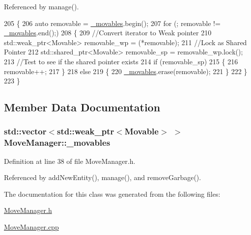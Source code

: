 Referenced by manage().


\begin{DoxyCode}
205 \{
206     \textcolor{keyword}{auto} removable = \hyperlink{classMoveManager_a7fc3d147dbcc1df9e2099e193bca489d}{\_movables}.begin();
207     \textcolor{keywordflow}{for} (; removable != \hyperlink{classMoveManager_a7fc3d147dbcc1df9e2099e193bca489d}{\_movables}.end();)
208     \{
209         \textcolor{comment}{//Convert iterator to Weak pointer}
210         std::weak\_ptr<Movable> removable\_wp = (*removable);
211         \textcolor{comment}{//Lock as Shared Pointer}
212         std::shared\_ptr<Movable> removable\_sp = removable\_wp.lock();
213         \textcolor{comment}{//Test to see if the shared pointer exists}
214         \textcolor{keywordflow}{if} (removable\_sp)
215         \{
216             removable++;
217         \}
218         \textcolor{keywordflow}{else}
219         \{
220             \hyperlink{classMoveManager_a7fc3d147dbcc1df9e2099e193bca489d}{\_movables}.erase(removable);
221         \}
222     \}
223 \}
\end{DoxyCode}


\subsection{Member Data Documentation}
\hypertarget{classMoveManager_a7fc3d147dbcc1df9e2099e193bca489d}{
\subsubsection[{\-\_\-movables}]{\setlength{\rightskip}{0pt plus 5cm}std\-::vector$<$std\-::weak\-\_\-ptr$<${\bf Movable}$>$ $>$ Move\-Manager\-::\-\_\-movables\hspace{0.3cm}{\ttfamily [private]}}}\label{classMoveManager_a7fc3d147dbcc1df9e2099e193bca489d}


Definition at line 38 of file Move\-Manager.\-h.



Referenced by add\-New\-Entity(), manage(), and remove\-Garbage().



The documentation for this class was generated from the following files\-:\begin{DoxyCompactItemize}
\item 
\hyperlink{MoveManager_8h}{Move\-Manager.\-h}\item 
\hyperlink{MoveManager_8cpp}{Move\-Manager.\-cpp}\end{DoxyCompactItemize}
